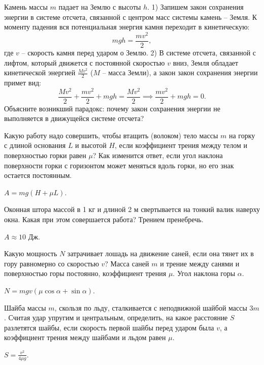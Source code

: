 \begin{ex}
Камень массы $m$ падает на Землю с высоты $h$. 1) Запишем закон сохранения энергии в системе отсчета, связанной с центром масс системы камень -- Земля. К моменту падения вся потенциальная энергия камня переходит в кинетическую: $$ mgh = \frac{mv^2}{2},$$ где $v$ -- скорость камня перед ударом о Землю.
2) В системе отсчета, связанной с лифтом, который движется с постоянной скоростью $v$ вниз, Земля обладает кинетической энергией $\frac{Mv^2}{2}$ ($M$ -- масса Земли), а закон закон сохранения энергии примет вид: $$\frac{Mv^2}{2} + \frac{mv^2}{2} + mgh = \frac{Mv^2}{2} \implies \frac{mv^2}{2} + mgh = 0.$$ Объясните возникший парадокс: почему закон сохранения энергии не выполняется в движущейся системе отсчета?
\end{ex}


\simpleProblems

\begin{ex} %
Какую работу надо совершить, чтобы втащить (волоком) тело массы $m$ на горку с длиной основания $L$ и высотой $H$, если коэффициент трения между телом и поверхностью горки равен $\mu$? Как изменится ответ, если угол наклона поверхности горки с горизонтом может меняться вдоль горки, но его знак остается постоянным.
\begin{ans}
$A=mg(H+\mu L)$.
\end{ans}
\end{ex}

\begin{ex}
Оконная штора массой в 1 кг и длиной 2 м свертывается на тонкий валик наверху окна. Какая при этом совершается работа? Трением пренебречь.
\begin{ans}
$A \approx 10$ Дж.
\end{ans}
\end{ex}

\begin{ex} %
Какую мощность $N$ затрачивает лошадь на движение саней, если она тянет их в гору равномерно со скоростью $v$? Масса саней $m$ и трение между санями и поверхностью горы постоянно, коэффициент трения $\mu$. Угол наклона горы $\alpha$.
\begin{ans}
$N = mgv(\mu \cos \alpha +\sin \alpha)$.
\end{ans}
\end{ex}

\begin{ex} %
Шайба массы $m$, скользя по льду, сталкивается с неподвижной шайбой массы $3m$. Считая удар упругим и центральным, определить, на какое расстояние $S$ разлетятся шайбы, если скорость первой шайбы перед ударом была $v$, а коэффициент трения между шайбами и льдом равен $\mu$.
\begin{ans}
$S = \frac{v^2}{4 \mu g}$.
\end{ans}
\end{ex}

